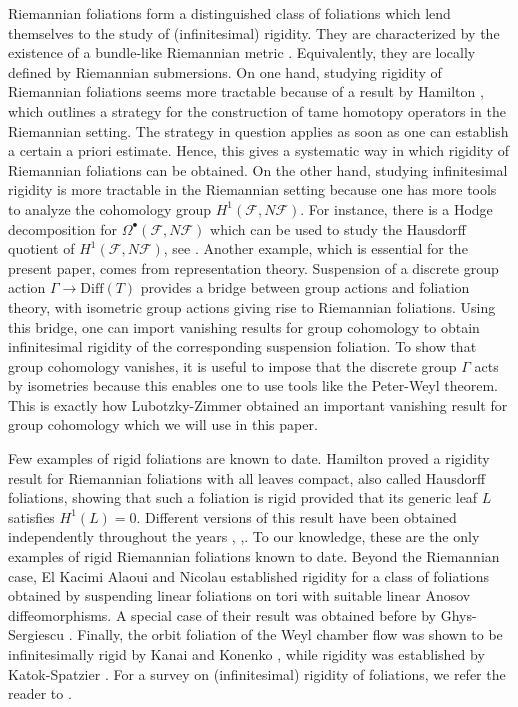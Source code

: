 \documentclass[11pt, letterpaper, oneside,reqno]{amsart}
\theoremstyle{plain}
\theoremstyle{underline}
\theoremstyle{definition}
\theoremstyle{remark}
\begin{document}
	Riemannian foliations form a distinguished class of foliations which lend themselves to the study of (infinitesimal) rigidity. They are characterized by the existence of a bundle-like Riemannian
	metric \cite{Reinhart}. Equivalently, they are locally defined by Riemannian submersions. On one hand, studying rigidity of Riemannian foliations seems more tractable because of a result by Hamilton \cite{Hamilton}, which outlines a strategy for the construction of tame homotopy operators in the Riemannian setting. The strategy in question applies as soon as one can establish a certain a priori estimate. Hence, this gives a systematic way in which rigidity of Riemannian foliations can be obtained. On the other hand, studying infinitesimal rigidity is more tractable in the Riemannian setting because one has more tools to analyze the cohomology group $H^{1}(\mathcal{F},N\mathcal{F})$. For instance, there is a Hodge decomposition for $\Omega^{\bullet}(\mathcal{F},N\mathcal{F})$ which can be used to study the Hausdorff quotient of $H^{1}(\mathcal{F},N\mathcal{F})$, see \cite{Alvarez}. Another example, which is essential for the present paper, comes from representation theory. Suspension of a discrete group action $\Gamma\rightarrow\text{Diff}(T)$ provides a bridge between group actions and foliation theory, with isometric group actions giving rise to Riemannian foliations. Using this bridge, one can import vanishing results for group cohomology to obtain infinitesimal rigidity of the corresponding suspension foliation. To show that group cohomology vanishes, it is useful to impose that the discrete group $\Gamma$ acts by isometries because this enables one to use tools like the Peter-Weyl theorem. This is exactly how  Lubotzky-Zimmer \cite{Zimmer} obtained an important vanishing result for group cohomology which we will use in this paper.


	
	\vspace{0.2cm}
	
	Few examples of rigid foliations are known to date. Hamilton \cite{Hamilton} proved a rigidity result for Riemannian foliations with all leaves compact, also called Hausdorff foliations, showing that such a foliation is rigid provided that its generic leaf $L$ satisfies $H^{1}(L)=0$.  Different versions of this result have been obtained independently throughout the years \cite{langevin}, \cite{epstein},\cite{rui}. To our knowledge, these are the only examples of rigid Riemannian foliations known to date. Beyond the Riemannian case, El Kacimi Alaoui and Nicolau \cite{kacimi} established rigidity for a class of foliations obtained by suspending linear foliations on tori with suitable linear Anosov diffeomorphisms. A special case of their result was obtained before by Ghys-Sergiescu \cite{ghys}. Finally, the orbit foliation of the Weyl chamber flow was shown to be infinitesimally rigid by Kanai \cite{Kanai} and Konenko \cite{Konenko}, while rigidity was established by Katok-Spatzier \cite{Katok}. For a survey on (infinitesimal) rigidity of foliations, we refer the reader to \cite[\S{}.1 and \S{}.2]{Asaoka}.
	
\end{document}
